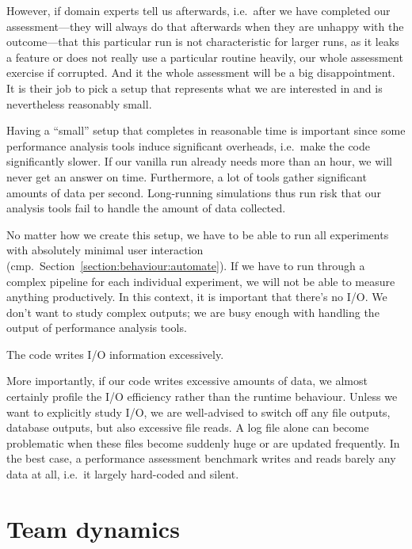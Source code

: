 However, if domain experts tell us afterwards, i.e.~after we have completed our assessment---they will always do that afterwards
    when they are unhappy with the outcome---that this particular run is not
    characteristic for larger runs, as it leaks a feature or does not really use a particular routine
    heavily, our whole assessment exercise if corrupted.
And it the whole assessment will be a big disappointment. 
It is their job to pick a setup that represents what we are interested in and is nevertheless reasonably small.


Having a ``small'' setup that completes in reasonable time is important since some performance analysis
    tools induce significant overheads, i.e.~make the code significantly slower.
    If our vanilla run already needs more than an hour, we will never get an
    answer on time. Furthermore, a lot of tools gather significant amounts of
    data per second. Long-running simulations thus run risk that our analysis
    tools fail to handle the amount of data collected.


No matter how we create this setup, we have to be able to run all experiments with absolutely minimal user interaction (cmp.~Section~\ref{section:behaviour:automate}).
If we have to run through a complex pipeline for each individual experiment, we will not be able to measure anything productively.
In this context, it is important that there's no I/O.
We don't want to study complex outputs; we are busy enough with handling the output of performance analysis tools.

\begin{assessmentcrime}
 The code writes I/O information excessively. 
\end{assessmentcrime}

\noindent
More importantly, if our code writes excessive amounts of data, we
    almost certainly profile the I/O efficiency rather than the runtime
    behaviour. Unless we want to explicitly study I/O, we are well-advised to
    switch off any file outputs, database outputs, but also excessive file
    reads.
 A log file alone can become problematic when these files become suddenly huge or are updated frequently.
 In the best case, a performance assessment benchmark writes and reads barely any data at all, i.e.~it largely hard-coded and silent.

\section{Team dynamics}

